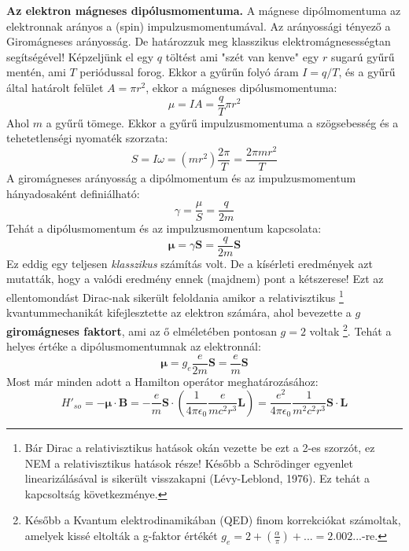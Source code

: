 \documentclass[../main.tex]{subfiles}
\begin{document}
\textbf{Az elektron mágneses dipólusmomentuma.} A mágnese dipólmomentuma az elektronnak arányos a (spin) impulzusmomentumával. Az arányossági tényező a Giromágneses arányosság.
De határozzuk meg klasszikus elektromágnesességtan segítségével! Képzeljünk el egy $q$ töltést ami "szét van kenve" egy $r$ sugarú gyűrű mentén, ami $T$ periódussal forog. Ekkor a gyűrűn folyó áram $ I = q/T$, és a gyűrű által határolt felület $A = \pi r^2$, ekkor a mágneses dipólusmomentuma:
\begin{equation}
    \mu = I A = \frac{q}{T} \pi r^2
\end{equation}
Ahol $m$ a gyűrű tömege. Ekkor a gyűrű impulzusmomentuma a szögsebesség és a tehetetlenségi nyomaték szorzata:
\begin{equation}
    S = I \omega = \left( m r^2 \right) \frac{2 \pi}{T} = \frac{2 \pi m r^2}{T}
\end{equation} 
A giromágneses arányosság a dipólmomentum és az impulzusmomentum hányadosaként definiálható:
\begin{equation}
    \gamma = \frac{\mu}{S} = \frac{q}{2m}
\end{equation}
Tehát a dipólusmomentum és az impulzusmomentum kapcsolata:
\begin{equation}
    \boldsymbol{\mu} = \gamma \mathbf{S} = \frac{q}{2m} \mathbf{S}
\end{equation}
Ez eddig egy teljesen \textit{klasszikus} számítás volt. De a kísérleti eredmények azt mutatták, hogy a valódi eredmény ennek (majdnem) pont a kétszerese!
Ezt az ellentomondást Dirac-nak sikerült feloldania amikor a relativisztikus
\footnote{Bár Dirac a relativisztikus hatások okán vezette be ezt a 2-es szorzót, ez NEM a relativisztikus hatások része! Később a Schrödinger egyenlet linearizálásával is sikerült visszakapni (Lévy-Leblond, 1976). Ez tehát a kapcsoltság következménye.}
kvantummechanikát kifejlesztette az elektron számára, ahol bevezette a $g$ \textbf{giromágneses faktort}, ami
az ő elméletében pontosan $g = 2$ voltak
\footnote{Később a Kvantum elektrodinamikában (QED) finom korrekciókat számoltak, amelyek kissé eltolták a g-faktor értékét $g_e = 2 + (\frac{\alpha}{\pi}) + ... = 2.002...$-re.}.
Tehát a helyes értéke a dipólusmomentumnak az elektronnál:
\begin{equation}
    \boldsymbol{\mu} = g_e \frac{e}{2m} \mathbf{S} = \frac{e}{m} \mathbf{S}
\end{equation}
Most már minden adott a Hamilton operátor meghatározásához:
\begin{equation}
    H'_{so} = - \boldsymbol{\mu} \cdot \mathbf{B} = - \frac{e}{m} \mathbf{S} \cdot \left( \frac{1}{4 \pi \epsilon_0} \frac{e}{m c^2 r^3} \mathbf{L} \right) = \frac{e^2}{4 \pi \epsilon_0} \frac{1}{m^2 c^2 r^3} \mathbf{S} \cdot \mathbf{L}
\end{equation}
\end{document}
